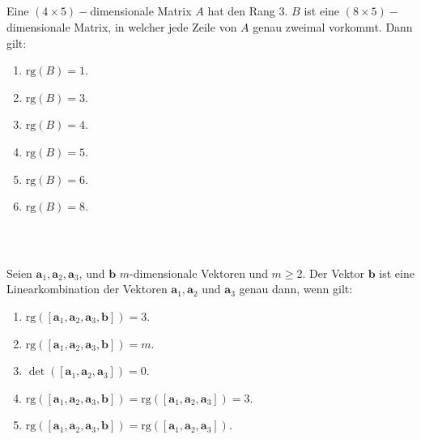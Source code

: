\subsection*{}
Eine $ (4 \times 5)- $dimensionale Matrix $ A $ hat den Rang $ 3 $.
$ B $ ist eine $ (8 \times 5)- $dimensionale Matrix, in welcher jede Zeile von $ A $ genau zweimal vorkommt. Dann gilt:
\renewcommand{\labelenumi}{(\alph{enumi})}
\begin{enumerate}
\item 
$ \mathrm{rg}(B) = 1 $.
\item
$ \mathrm{rg}(B) = 3 $.
\item
$ \mathrm{rg}(B) = 4 $.
\item
$ \mathrm{rg}(B) = 5 $.
\item
$ \mathrm{rg}(B) = 6 $.
\item
$ \mathrm{rg}(B) = 8 $.
\end{enumerate}
\ \\
\subsection*{}
Seien $ \textbf{a}_1, \textbf{a}_2 , \textbf{a}_3 $, und $ \textbf{b} $ $ m $-dimensionale Vektoren und $ m \geq 2 $.
Der Vektor $ \textbf{b} $ ist eine Linearkombination der Vektoren $  \textbf{a}_1, \textbf{a}_2  $ und $ \textbf{a}_3 $ genau dann, wenn gilt:
\renewcommand{\labelenumi}{(\alph{enumi})}
\begin{enumerate}
	\item 
	$ \mathrm{rg}\left([ \textbf{a}_1, \textbf{a}_2 , \textbf{a}_3 ,\textbf{b}] \right) = 3 $.
	\item
	$ \mathrm{rg}\left([ \textbf{a}_1, \textbf{a}_2 , \textbf{a}_3 ,\textbf{b}] \right) =m $.
	
	\item
	$ \det\left([ \textbf{a}_1, \textbf{a}_2 , \textbf{a}_3] \right) = 0 $.
	\item
	$ \mathrm{rg}\left([ \textbf{a}_1, \textbf{a}_2 , \textbf{a}_3 ,\textbf{b}] \right) = \mathrm{rg}\left([ \textbf{a}_1, \textbf{a}_2 , \textbf{a}_3]  \right) = 3 $.
	\item
	$ \mathrm{rg}\left([ \textbf{a}_1, \textbf{a}_2 , \textbf{a}_3 ,\textbf{b}] \right) = \mathrm{rg}\left([ \textbf{a}_1, \textbf{a}_2 , \textbf{a}_3] \right) $.
\end{enumerate}
\ \\
